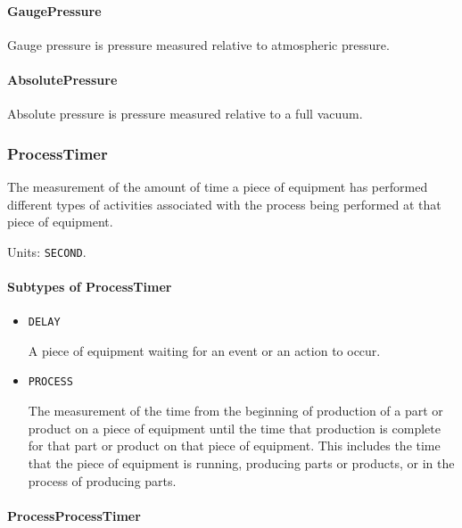 \paragraph{GaugePressure}\mbox{}
\label{sec:GaugePressure}


Gauge pressure is pressure measured relative to atmospheric pressure.


\paragraph{AbsolutePressure}\mbox{}
\label{sec:AbsolutePressure}


Absolute pressure is pressure measured relative to a full vacuum.


\subsubsection{ProcessTimer}
\label{sec:ProcessTimer}



The measurement of the amount of time a piece of equipment has performed different types of activities associated with the process being performed at that piece of equipment.


Units: \texttt{SECOND}.

\paragraph{Subtypes of ProcessTimer}\mbox{}
\label{sec:Subtypes of ProcessTimer}

\begin{itemize}

\item \texttt{DELAY}


A piece of equipment waiting for an event or an action to occur.

\item \texttt{PROCESS}


The measurement of the time from the beginning of production of a part or product on a piece of equipment until the time that production is complete for that part or product on that piece of equipment.  This includes the time that the piece of equipment is running, producing parts or products, or in the process of producing parts.


\end{itemize}

\paragraph{ProcessProcessTimer}\mbox{}
\label{sec:ProcessProcessTimer}


